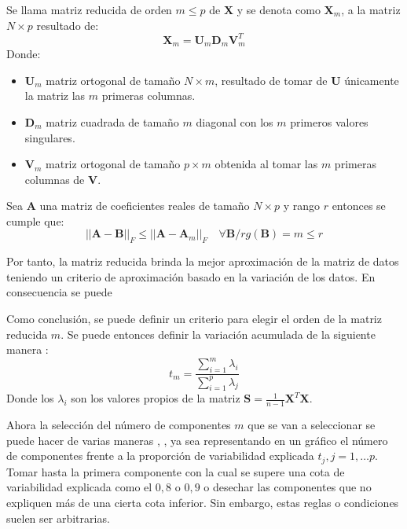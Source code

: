 \begin{defi}
Se llama matriz reducida de orden $m\leq p$ de $\textbf{X}$ y se denota como $\textbf{X}_m$, a la matriz $N\times p$ resultado de:
\begin{equation}
\textbf{X}_m=\textbf{U}_m\mathbf{D}_m\textbf{V}^T_m
\end{equation}
Donde:
\begin{itemize}
\item $\textbf{U}_m$ matriz ortogonal de tamaño $N \times m$, resultado de tomar de \textbf{U} únicamente la matriz las $m$ primeras columnas. 
\item $\mathbf{D}_m$  matriz cuadrada de tamaño $m$ diagonal con los $m$ primeros valores singulares. 
\item $\textbf{V}_m$ matriz ortogonal de tamaño $p \times m$ obtenida al tomar las $m$ primeras columnas de \textbf{V}.
\end{itemize}
\end{defi}

\begin{teorema}
Sea \textbf{A} una matriz de coeficientes reales de tamaño $N\times p$ y rango $r$  entonces se cumple que:
\begin{equation}
||\textbf{A}-\textbf{B}||_F\leq ||\textbf{A}-\textbf{A}_m||_F \quad \forall \textbf{B}/ rg(\textbf{B})=m \leq r
\end{equation} 
\end{teorema}

\noindent Por tanto, la matriz reducida brinda la mejor aproximación de la matriz de datos teniendo un criterio de aproximación basado en la variación de los datos. En consecuencia se puede 

\noindent Como conclusión, se puede definir un criterio para elegir el orden de la matriz reducida $m$. Se puede entonces definir la variación acumulada de la siguiente manera \cite{Chatfield 1989}:
\begin{equation}
t_m=\dfrac{\sum_{i=1}^{m}\lambda_i}{\sum_{i=1}^{p}\lambda_j}
\end{equation}
\noindent Donde los $\lambda_i$ son los valores propios de la matriz $\textbf{S}=\frac{1}{n-1}\textbf{X}^T\textbf{X}$.

\noindent Ahora la selección del número de componentes $m$ que se van a seleccionar se puede hacer de varias maneras \cite{Peña 2002}, \cite{Jollife 1986}, ya sea representando en un gráfico el número de componentes frente a la proporción de variabilidad explicada $t_j, j=1,\ldots p$. Tomar hasta la primera componente con la cual se supere una cota de variabilidad explicada como el $0,8$ o $0,9$ \cite {Jollife 1986} o desechar las componentes que no expliquen más de una cierta cota inferior. Sin embargo, estas reglas o condiciones suelen ser arbitrarias.

